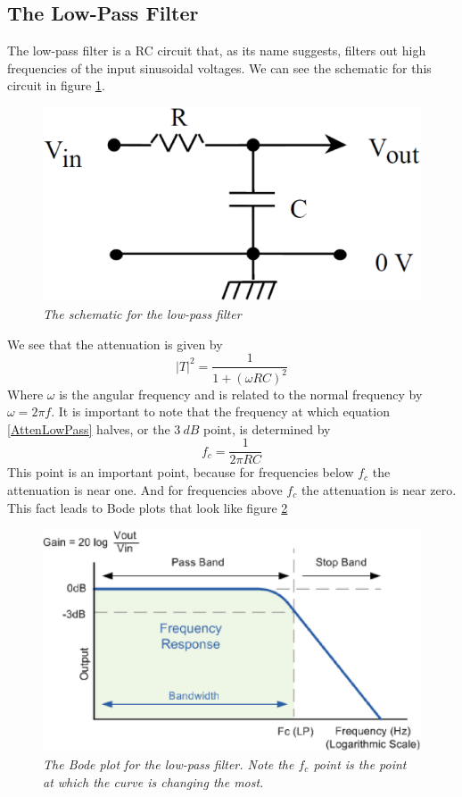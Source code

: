 \documentclass[11pt]{article}
\numberwithin{equation}{section}
\numberwithin{figure}{section}
\numberwithin{table}{section}
\begin{document}
\subsection{The Low-Pass Filter}
The low-pass filter is a RC circuit that, as its name suggests, filters out high frequencies of the input sinusoidal voltages. We can see the schematic for this circuit in figure \ref{FigLowPass}.
\begin{figure}[h]
\centering
\includegraphics[scale=0.20]{LowPass.eps}
\caption{\textit{The schematic for the low-pass filter}}
\label{FigLowPass}
\end{figure}
We see that the attenuation is given by 
\begin{equation}
|T|^2 = \frac{1}{1+(\omega RC)^2}
\label{AttenLowPass}
\end{equation}
Where $\omega$ is the angular frequency and is related to the normal frequency by $\omega = 2\pi f$. It is important to note that the frequency at which equation \ref{AttenLowPass} halves, or the $3\ dB$ point, is determined by
\begin{equation}
f_c = \frac{1}{2\pi RC}
\label{ResFreq}
\end{equation}
This point is an important point, because for frequencies below $f_c$ the attenuation is near one. And for frequencies above $f_c$ the attenuation is near zero. This fact leads to Bode plots that look like figure \ref{BodeLowPass}
\begin{figure}[h]
\centering
\includegraphics[scale=0.65]{BodeLowPass.eps}
\caption{\textit{The Bode plot for the low-pass filter. Note the $f_c$ point is the point at which the curve is changing the most.}}
\label{BodeLowPass}
\end{figure}
\end{document}
